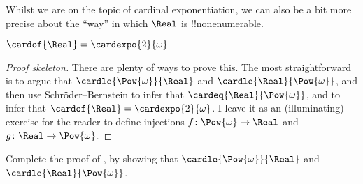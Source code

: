 \documentclass[../../../include/open-logic-section]{subfiles}
\begin{document}
Whilst we are on the topic of cardinal exponentiation, we can also be a bit more precise about the ``way'' in which $\Real$ is !!{nonenumerable}. 
\begin{thm}
	$\cardof{\Real} = \cardexpo{2}{\omega}$
\end{thm}
\begin{proof}[Proof skeleton] There are plenty of ways to prove this. The most straightforward is to argue that $\cardle{\Pow{\omega}}{\Real}$ and $\cardle{\Real}{\Pow{\omega}}$, and then use Schr\"oder--Bernstein to infer that $\cardeq{\Real}{\Pow{\omega}}$, and   to infer that $\cardof{\Real} = \cardexpo{2}{\omega}$. I leave it as an (illuminating) exercise for the reader to define injections $f \colon \Pow{\omega} \to \Real$ and $g \colon \Real \to \Pow{\omega}$.
\end{proof}
\begin{prob}
	Complete the proof of , by showing that $\cardle{\Pow{\omega}}{\Real}$ and $\cardle{\Real}{\Pow{\omega}}$.
\end{prob}
\end{document}
